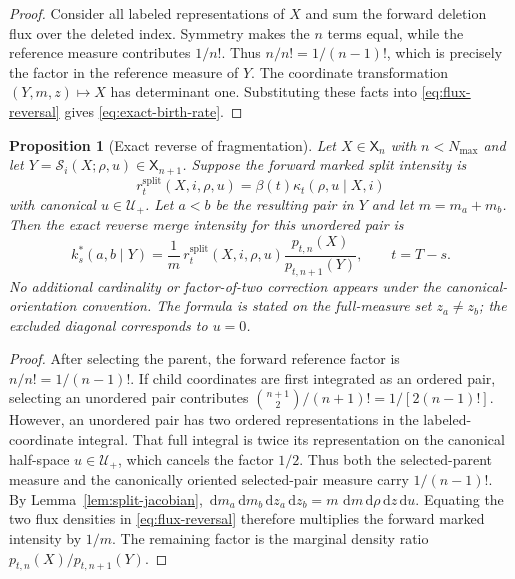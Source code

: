 \documentclass[10pt]{article}
\newtheorem{proposition}[theorem]{Proposition}
\theoremstyle{definition}
\theoremstyle{remark}
\newcommand{\dd}{\,\mathrm{d}}
\newcommand{\state}{\mathsf{X}}
\newcommand{\splitmap}{\mathcal{S}}
\begin{document}
\begin{proof}
Consider all labeled representations of $X$ and sum the forward deletion flux over the deleted index.  Symmetry makes the $n$ terms equal, while the reference measure contributes $1/n!$.  Thus $n/n!=1/(n-1)!$, which is precisely the factor in the reference measure of $Y$.  The coordinate transformation $(Y,m,z)\mapsto X$ has determinant one.  Substituting these facts into \eqref{eq:flux-reversal} gives \eqref{eq:exact-birth-rate}.
\end{proof}

\begin{proposition}[Exact reverse of fragmentation]
\label{prop:reverse-split}
Let $X\in\state_n$ with $n<N_{\max}$ and let
$Y=\splitmap_i(X;\rho,u)\in\state_{n+1}$.  Suppose the forward marked split intensity is
\begin{equation}
  r_t^{\mathrm{split}}(X,i,\rho,u)
  =\beta(t)\kappa_t(\rho,u\mid X,i)
  \label{eq:marked-split-intensity}
\end{equation}
with canonical $u\in\mathcal U_+$.  Let $a<b$ be the resulting pair in $Y$ and let $m=m_a+m_b$.  Then the exact reverse merge intensity for this unordered pair is
\begin{equation}
  k_s^*(a,b\mid Y)
  =\frac{1}{m}\,
  r_t^{\mathrm{split}}(X,i,\rho,u)
  \frac{p_{t,n}(X)}{p_{t,n+1}(Y)},
  \qquad t=T-s.
  \label{eq:exact-merge-rate}
\end{equation}
No additional cardinality or factor-of-two correction appears under the
canonical-orientation convention.  The formula is stated on the
full-measure set $z_a\neq z_b$; the excluded diagonal corresponds to
$u=0$.
\end{proposition}

\begin{proof}
After selecting the parent, the forward reference factor is
$n/n!=1/(n-1)!$.  If child coordinates are first integrated as an ordered
pair, selecting an unordered pair contributes
$\binom{n+1}{2}/(n+1)!=1/[2(n-1)!]$.  However, an unordered pair has two
ordered representations in the labeled-coordinate integral.  That full
integral is twice its representation on the canonical half-space
$u\in\mathcal U_+$, which cancels the factor $1/2$.  Thus both the
selected-parent measure and the canonically oriented
selected-pair measure carry $1/(n-1)!$.  By
Lemma~\ref{lem:split-jacobian},
$\dd m_a\dd m_b\dd z_a\dd z_b=m\,\dd m\dd\rho\dd z\dd u$.
Equating the two flux densities in \eqref{eq:flux-reversal} therefore
multiplies the forward marked intensity by $1/m$.  The remaining factor is
the marginal density ratio $p_{t,n}(X)/p_{t,n+1}(Y)$.
\end{proof}
\end{document}
